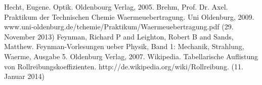 \pagebreak
\begin{thebibliography}{9}
 Hecht, Eugene. Optik. Oldenbourg Verlag, 2005.
 Brehm, Prof. Dr. Axel. Praktikum der Technischen Chemie Waermeuebertragung. Uni Oldenburg, 2009. www.uni-oldenburg.de/tchemie/Praktikum/Waermeuebertragung.pdf (29. November 2013)
Feynman, Richard P and Leighton, Robert B and Sands, Matthew. Feynman-Vorlesungen ueber Physik, Band 1: Mechanik, Strahlung, Waerme, Ausgabe 5. Oldenburg Verlag, 2007.
 Wikipedia. Tabellarische Auflistung von Rollreibungskoeffizienten. http://de.wikipedia.org/wiki/Rollreibung. (11. Januar 2014)
\end{thebibliography}

